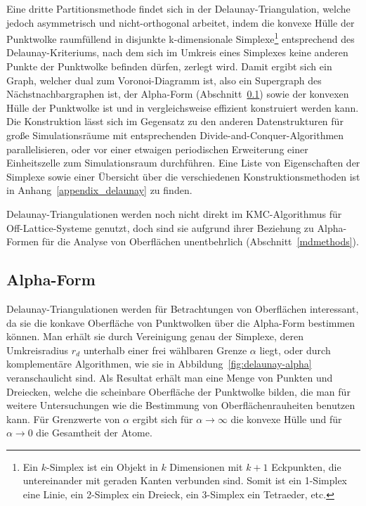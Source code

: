 Eine dritte Partitionsmethode findet sich in der Delaunay-Triangulation, welche jedoch asymmetrisch und nicht-orthogonal arbeitet, indem die konvexe Hülle der Punktwolke raumfüllend in disjunkte k-dimensionale Simplexe\footnote{Ein $k$-Simplex ist ein Objekt in $k$ Dimensionen mit $k+1$ Eckpunkten, die untereinander mit geraden Kanten verbunden sind. Somit ist ein 1-Simplex eine Linie, ein 2-Simplex ein Dreieck, ein 3-Simplex ein Tetraeder, etc.}
entsprechend des Delaunay-Kriteriums, nach dem sich im Umkreis eines Simplexes keine anderen Punkte der Punktwolke befinden dürfen, zerlegt wird.
Damit ergibt sich ein Graph, welcher dual zum Voronoi-Diagramm ist, also ein Supergraph des Nächstnachbargraphen ist, der Alpha-Form (Abschnitt~\ref{dataalphaform}) sowie der konvexen Hülle der Punktwolke ist und in  vergleichsweise effizient konstruiert werden kann.
Die Konstruktion lässt sich im Gegensatz zu den anderen Datenstrukturen für große Simulationsräume mit entsprechenden Divide-and-Conquer-Algorithmen parallelisieren, oder vor einer etwaigen periodischen Erweiterung einer Einheitszelle zum Simulationsraum durchführen.
Eine Liste von Eigenschaften der Simplexe sowie einer Übersicht über die verschiedenen Konstruktionsmethoden ist in Anhang~\ref{appendix_delaunay} zu finden.

Delaunay-Triangulationen werden noch nicht direkt im KMC-Algorithmus für Off-Lattice-Systeme genutzt, doch sind sie aufgrund ihrer Beziehung zu Alpha-Formen für die Analyse von Oberflächen unentbehrlich (Abschnitt~\ref{mdmethods}).

\subsection{Alpha-Form}
\label{dataalphaform}

Delaunay-Triangulationen werden für Betrachtungen von Oberflächen interessant, da sie die konkave Oberfläche von Punktwolken über die Alpha-Form bestimmen können.
Man erhält sie durch Vereinigung genau der Simplexe, deren Umkreisradius $r_d$ unterhalb einer frei wählbaren Grenze $\alpha$ liegt, oder durch komplementäre Algorithmen, wie sie in Abbildung~\ref{fig:delaunay-alpha} veranschaulicht sind.
Als Resultat erhält man eine Menge von Punkten und Dreiecken, welche die scheinbare Oberfläche der Punktwolke bilden, die man für weitere Untersuchungen wie die Bestimmung von Oberflächenrauheiten benutzen kann.
Für Grenzwerte von $\alpha$ ergibt sich für $\alpha \rightarrow \infty$ die konvexe Hülle und für $\alpha \rightarrow 0$ die Gesamtheit der Atome.

